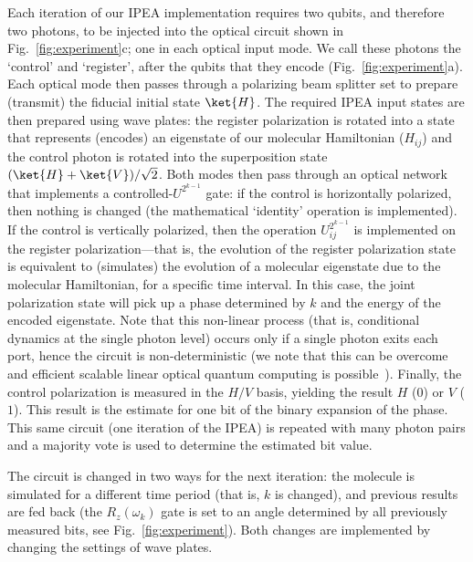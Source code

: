 \documentclass[11pt,oneside,final]{huthesis}%
\begin{document}
Each iteration of our IPEA implementation requires two qubits, and therefore two photons, to be 
injected into the optical circuit shown in Fig.~\ref{fig:experiment}c; one in each optical input 
mode. We call these photons the `control' and `register', after the qubits that they encode 
(Fig.~\ref{fig:experiment}a). Each optical mode then passes through a polarizing beam splitter set to 
prepare (transmit) the fiducial initial state $\ket{H}$. The required IPEA  input states are then 
prepared using wave plates: the register polarization is rotated into a state that represents 
(encodes) an eigenstate of our molecular Hamiltonian ($H_{ij}$) and the control photon is 
rotated into the superposition state $(\ket{H}+\ket{V})/\sqrt{2}$. Both modes then pass through an 
optical network that implements a controlled-$U^{2^{k-1}}$ gate: if the control is horizontally 
polarized, then nothing is changed (the mathematical `identity' operation is implemented). If the 
control is vertically polarized, then the operation $U_{ij}^{2^{k-1}}$ is implemented on the 
register polarization---that is, the evolution of the register polarization state is equivalent to 
(simulates) the evolution of a molecular eigenstate due to the molecular Hamiltonian, for a 
specific time interval. In this case, the joint polarization state will pick up a phase determined by 
$k$ and the energy of the encoded eigenstate. Note that this non-linear process (that is, 
conditional dynamics at the single photon level) occurs only if a single photon exits each port, 
hence the circuit is non-deterministic (we note that this can be overcome and efficient scalable 
linear optical quantum computing is possible~\cite{Knill01, Nielsen04}). Finally, the control 
polarization is measured in the $H/V$ basis, yielding the result $H$ ($0$) or $V$ ($1$). This 
result is the estimate for one bit of the binary expansion of the phase. This same circuit (one 
iteration of the IPEA) is repeated with many photon pairs and a majority vote is used to 
determine the estimated bit value.

The circuit is changed in two ways for the next iteration: the molecule is simulated for a different 
time period (that is, $k$ is changed), and previous results are fed back (the $R_z(\omega_k)$ 
gate is set to an angle determined by all previously measured bits, see Fig.~\ref{fig:experiment}). 
Both changes are implemented by changing the settings of wave plates.
\end{document}
